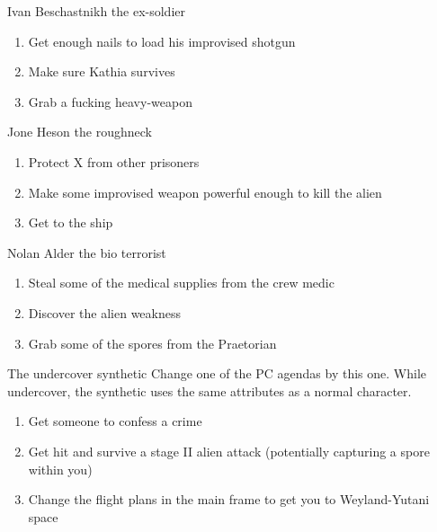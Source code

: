 \begin{rpg-commentbox}{Ivan Beschastnikh the ex-soldier}
    \begin{enumerate}[label=\textbf{Act \arabic*}, leftmargin=1cm]
        \item Get enough nails to load his improvised shotgun
        \item Make sure Kathia survives
        \item Grab a fucking heavy-weapon
    \end{enumerate}
\end{rpg-commentbox}

\begin{rpg-commentbox}{Jone Heson the roughneck}
    \begin{enumerate}[label=\textbf{Act \arabic*}, leftmargin=1cm]
        \item Protect X from other prisoners
        \item Make some improvised weapon powerful enough to kill the alien
        \item Get to the ship
    \end{enumerate}
\end{rpg-commentbox}

\begin{rpg-commentbox}{Nolan Alder the  bio terrorist}
    \begin{enumerate}[label=\textbf{Act \arabic*}, leftmargin=1cm]
        \item Steal some of the medical supplies from the crew medic
        \item Discover the alien weakness
        \item Grab some of the spores from the Praetorian
    \end{enumerate}
\end{rpg-commentbox}

 
\begin{rpg-commentbox}{The undercover synthetic}
    Change one of the PC agendas by this one. While undercover, the synthetic uses the same attributes as a normal character.

    \begin{enumerate}[label=\textbf{Act \arabic*}, leftmargin=1cm]
        \item Get someone to confess a crime
        \item Get hit and survive a stage II alien attack (potentially capturing a spore within you)
        \item Change the flight plans in the main frame to get you to Weyland-Yutani space
    \end{enumerate}
\end{rpg-commentbox}

